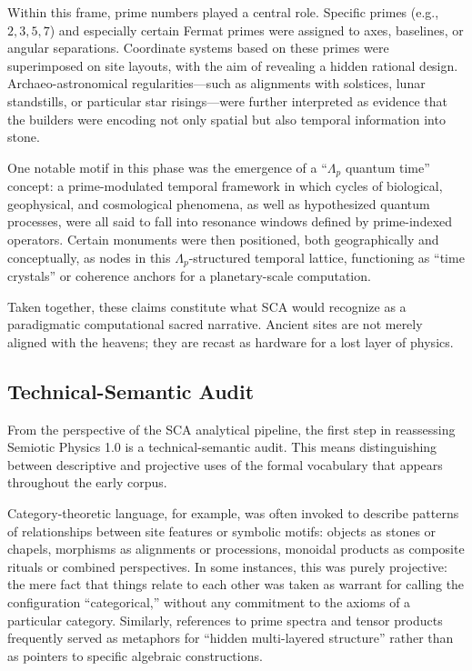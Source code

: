 \documentclass[12]{amsart}
\theoremstyle{plain}
\begin{document}
Within this frame, prime numbers played a central role. Specific primes (e.g., $2,3,5,7$) and especially certain Fermat primes were assigned to axes, baselines, or angular separations. Coordinate systems based on these primes were superimposed on site layouts, with the aim of revealing a hidden rational design. Archaeo-astronomical regularities---such as alignments with solstices, lunar standstills, or particular star risings---were further interpreted as evidence that the builders were encoding not only spatial but also temporal information into stone.

One notable motif in this phase was the emergence of a ``$\Lambda_p$ quantum time'' concept: a prime-modulated temporal framework in which cycles of biological, geophysical, and cosmological phenomena, as well as hypothesized quantum processes, were all said to fall into resonance windows defined by prime-indexed operators. Certain monuments were then positioned, both geographically and conceptually, as nodes in this $\Lambda_p$-structured temporal lattice, functioning as ``time crystals'' or coherence anchors for a planetary-scale computation.

Taken together, these claims constitute what SCA would recognize as a paradigmatic computational sacred narrative. Ancient sites are not merely aligned with the heavens; they are recast as hardware for a lost layer of physics.

\subsection{Technical-Semantic Audit}

From the perspective of the SCA analytical pipeline, the first step in reassessing Semiotic Physics 1.0 is a technical-semantic audit. This means distinguishing between descriptive and projective uses of the formal vocabulary that appears throughout the early corpus.

Category-theoretic language, for example, was often invoked to describe patterns of relationships between site features or symbolic motifs: objects as stones or chapels, morphisms as alignments or processions, monoidal products as composite rituals or combined perspectives. In some instances, this was purely projective: the mere fact that things relate to each other was taken as warrant for calling the configuration ``categorical,'' without any commitment to the axioms of a particular category. Similarly, references to prime spectra and tensor products frequently served as metaphors for ``hidden multi-layered structure'' rather than as pointers to specific algebraic constructions.
\end{document}
